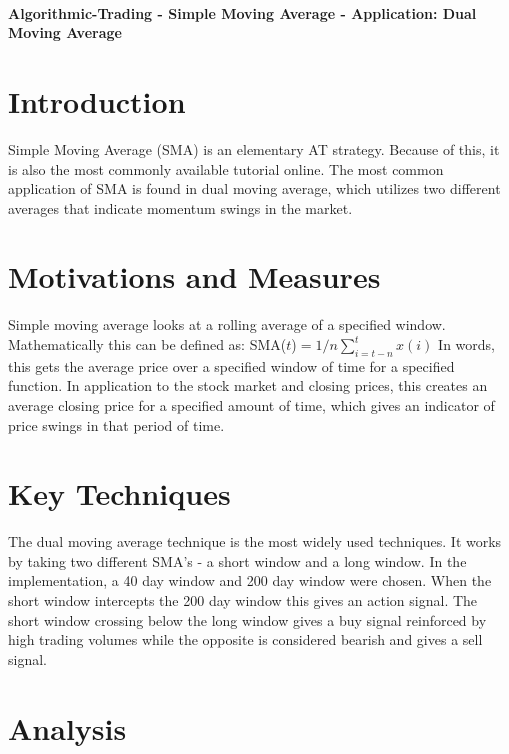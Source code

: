 \documentclass[letterpaper,11pt]{article}
\begin{document}
\thispagestyle{plain}


 \\

\noindent\textbf{Algorithmic-Trading - Simple Moving Average - Application: Dual Moving Average}

\section*{Introduction }

Simple Moving Average (SMA) is an elementary AT strategy. Because of this, it is also the most commonly available tutorial online. The most common application of SMA is found in dual moving average, which utilizes two different averages that indicate momentum swings in the market.

\section*{Motivations and Measures}

Simple moving average looks at a rolling average of a specified window. Mathematically this can be defined as: SMA($t$)$ = 1/n \sum_{i=t-n}^{t}x(i)$ \cite{} In words, this gets the average price over a specified window of time for a specified function. In application to the stock market and closing prices, this creates an average closing price for a specified amount of time, which gives an indicator of price swings in that period of time.

\section*{Key Techniques}

The dual moving average technique is the most widely used techniques. It works by taking two different SMA's - a short window and a long window. In the implementation, a 40 day window and 200 day window were chosen. When the short window intercepts the 200 day window this gives an action signal. The short window crossing below the long window gives a buy signal reinforced by high trading volumes while the opposite is considered bearish and gives a sell signal. 

\section*{Analysis}
\end{document}
